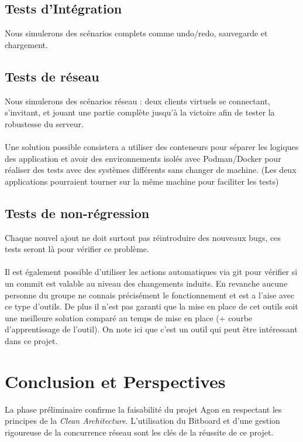 \documentclass[10pt]{article} %
\begin{document}
\subsection{Tests d'Intégration}
Nous simulerons des scénarios complets comme undo/redo, sauvegarde et chargement.
\subsection{Tests de réseau}
Nous simulerons des scénarios réseau : deux clients virtuels se connectant, s'invitant, et jouant une partie complète jusqu'à la victoire afin de tester la robustesse du serveur. \\ 
\\
Une solution possible consistera a utiliser des conteneurs pour séparer les logiques des application et avoir des environnements isolés avec Podman/Docker pour réaliser des tests avec des systèmes différents sans changer de machine. (Les deux applications pourraient tourner sur la même machine pour faciliter les tests)
\subsection{Tests de non-régression}
Chaque nouvel ajout ne doit surtout pas réintroduire des nouveaux bugs, ces tests seront là pour vérifier ce problème.
\\\\
Il est également possible d'utiliser les actions automatiques via git pour vérifier si un commit est valable au niveau des changements induits. En revanche aucune personne du groupe ne connais précisément le fonctionnement et est a l'aise avec ce type d'outils. De plus il n'est pas garanti que la mise en place de cet outils soit une meilleure solution comparé au temps de mise en place (+ courbe d'apprentissage de l'outil). On note ici que c'est un outil qui peut être intéressant dans ce projet.

\section{Conclusion et Perspectives}
La phase préliminaire confirme la faisabilité du projet Agon en respectant les principes de la \textit{Clean Architecture}. L'utilisation du Bitboard et d'une gestion rigoureuse de la concurrence réseau sont les clés de la réussite de ce projet. 
\end{document}
